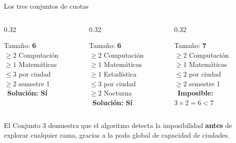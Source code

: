 \documentclass[aspectratio=169, 10pt]{beamer}
\begin{document}
\begin{frame}{Los tres conjuntos de cuotas}
  \begin{columns}[T]
    \begin{column}{0.32\textwidth}
      \begin{tcolorbox}[colback=unalverde!10, colframe=unalverde, title=Conjunto 1 — Base]
        \small
        Tamaño: \textbf{6} \\[3pt]
        $\geq 2$ Computación \\
        $\geq 1$ Matemáticas \\
        $\leq 3$ por ciudad \\
        $\geq 2$ semestre 1 \\[3pt]
        \textcolor{unalverde}{\faCheckCircle\ \textbf{Solución: Sí}}
      \end{tcolorbox}
    \end{column}
    \begin{column}{0.32\textwidth}
      \begin{tcolorbox}[colback=accentazul!10, colframe=accentazul, title=Conjunto 2 — Diversidad]
        \small
        Tamaño: \textbf{6} \\[3pt]
        $\geq 2$ Computación \\
        $\geq 1$ Matemáticas \\
        $\geq 1$ Estadística \\
        $\leq 3$ por ciudad \\
        $\geq 2$ Nocturna \\[3pt]
        \textcolor{accentazul}{\faCheckCircle\ \textbf{Solución: Sí}}
      \end{tcolorbox}
    \end{column}
    \begin{column}{0.32\textwidth}
      \begin{tcolorbox}[colback=red!10, colframe=red!60, title=Conjunto 3 — Sin solución]
        \small
        Tamaño: \textbf{7} \\[3pt]
        $\geq 2$ Computación \\
        $\geq 1$ Matemáticas \\
        $\leq 2$ por ciudad \\
        $\geq 2$ semestre 1 \\[3pt]
        \textcolor{red!70}{\faTimesCircle\ \textbf{Imposible:}} \\
        \tiny $3 \times 2 = 6 < 7$
      \end{tcolorbox}
    \end{column}
  \end{columns}

  \vspace{0.4cm}
  \begin{center}
    \small
    El Conjunto 3 demuestra que el algoritmo detecta la imposibilidad \textbf{antes} de explorar cualquier rama, gracias a la poda global de capacidad de ciudades.
  \end{center}
\end{frame}
\end{document}
